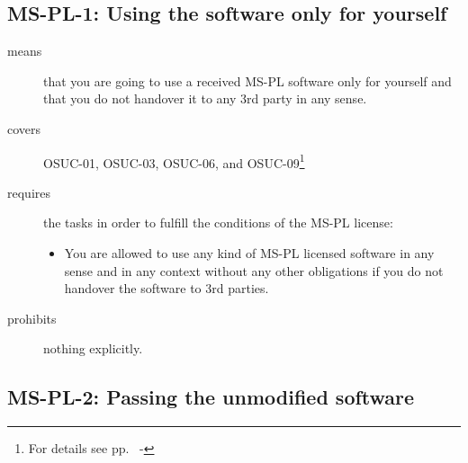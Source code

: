 \begin{center}
\begin{footnotesize}
{{{{{        }


      }
 
    }
   }   
}
\end{footnotesize}
\end{center}

\subsection{MS-PL-1: Using the software only for yourself}
\label{OSUC-01-MS-PL} 
\label{OSUC-03-MS-PL} 
\label{OSUC-06-MS-PL}
\label{OSUC-09-MS-PL}
  
\begin{description}
  \item[means] that you are going to use a received MS-PL software only for
  yourself and that you do not handover it to any 3rd party in any sense.
  \item[covers] OSUC-01, OSUC-03, OSUC-06, and OSUC-09\footnote{For details see
  pp.\ \pageref{OSUC-01-DEF} - \pageref{OSUC-09-DEF}}
  \item[requires] the tasks in order to fulfill the conditions of the MS-PL
  license:
  \begin{itemize}
    \item You are allowed to use any kind of MS-PL licensed software in any
    sense and in any context without any other obligations if you do not
    handover the software to 3rd parties.
  \end{itemize}
\item[prohibits] nothing explicitly.
\end{description}


\subsection{MS-PL-2: Passing the unmodified software}
\label{OSUC-02-MS-PL} \label{OSUC-05-MS-PL} \label{OSUC-07-MS-PL} 

